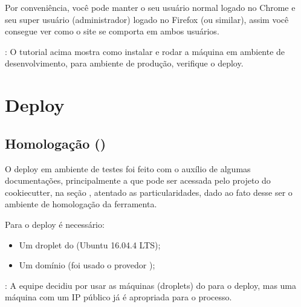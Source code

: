 \documentclass[letterpaper,10pt,english]{sphinxmanual}
\begin{document}
Por conveniência, você pode manter o seu usuário normal logado no Chrome e seu super usuário (administrador) logado no Firefox (ou similar), assim você consegue ver como o site se comporta em ambos usuários.

: O tutorial acima mostra como instalar e rodar a máquina em ambiente de desenvolvimento, para ambiente de produção, verifique o deploy.


\chapter{Deploy}
\label{\detokenize{deploy::doc}}\label{\detokenize{deploy:deploy}}

\section{Homologação ()}
\label{\detokenize{deploy:homologacao-staging}}
O deploy em ambiente de testes foi feito com o auxílio de algumas documentações, principalmente a que pode ser acessada pelo projeto do cookiecutter, na seção , atentado as particularidades, dado ao fato desse ser o ambiente de homologação da ferramenta.

Para o deploy é necessário:
\begin{itemize}
\item {} 
Um droplet do  (Ubuntu 16.04.4 LTS);

\item {} 
Um domínio (foi usado o provedor );

\end{itemize}

: A equipe decidiu por usar as máquinas (droplets) do  para o deploy, mas uma máquina com um IP público já é apropriada para o processo.
\end{document}
